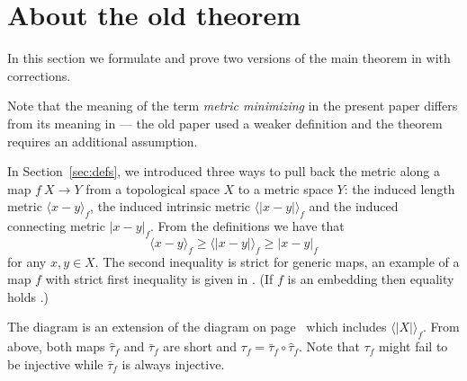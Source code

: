\section{About the old theorem}\label{sec:old-thm}

In this section we formulate and prove two versions of the main theorem in \cite{petrunin-metric-min} with corrections.

Note that the meaning of the term \emph{metric minimizing} in the present paper differs from its meaning in \cite{petrunin-metric-min}
 --- the old paper used a weaker definition and the theorem requires an additional assumption.

In Section~\ref{sec:defs}, we introduced three ways to pull back the metric along a map $f\:X\to Y$ from a topological space $X$
 to a metric space $Y$: 
the induced length metric
$\langle x-y\rangle_f$,
the induced intrinsic metric $\langle| x-y|\rangle_f$
and the induced connecting metric $|x-y|_f$.
From the definitions we have that 
\[\langle x-y\rangle_f\ge \langle| x-y|\rangle_f\ge |x-y|_f\]
for any $x,y\in X$.
The second inequality is strict for generic maps, 
an example of a map $f$ with strict first inequality is given in \cite[4.2]{petrunin-intrinisic}.
(If $f$ is an embedding then equality holds \cite[4.5]{ledonne}.)
\begin{figure}[h]
\centering
{}
\end{figure}
The diagram is an extension of the diagram on page~\pageref{diagram-page} which includes $\langle|X|\rangle_f$.
From above, both maps $\hat\tau_f$ and $\bar\tau_f$ are short and $\tau_f=\bar\tau_f\circ\hat\tau_f$.
Note that $\tau_f$ might fail to be injective while $\bar\tau_f$ is always injective.

